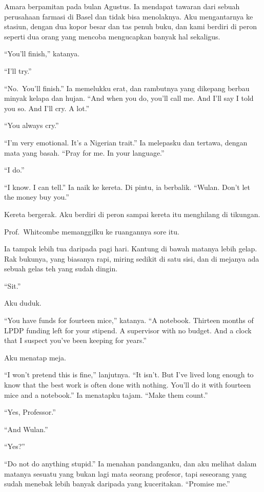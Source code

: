 \documentclass[11pt,twoside,openany]{book}
\begin{document}
Amara berpamitan pada bulan Agustus. Ia mendapat tawaran dari sebuah perusahaan farmasi di Basel dan tidak bisa menolaknya. Aku mengantarnya ke stasiun, dengan dua kopor besar dan tas penuh buku, dan kami berdiri di peron seperti dua orang yang mencoba mengucapkan banyak hal sekaligus.

``You'll finish,'' katanya.

``I'll try.''

``No.~You'll finish.'' Ia memelukku erat, dan rambutnya yang dikepang berbau minyak kelapa dan hujan. ``And when you do, you'll call me. And I'll say I told you so. And I'll cry. A lot.''

``You always cry.''

``I'm very emotional. It's a Nigerian trait.'' Ia melepasku dan tertawa, dengan mata yang basah. ``Pray for me. In your language.''

``I do.''

``I know. I can tell.'' Ia naik ke kereta. Di pintu, ia berbalik. ``Wulan. Don't let the money buy you.''

Kereta bergerak. Aku berdiri di peron sampai kereta itu menghilang di tikungan.

Prof.~Whitcombe memanggilku ke ruangannya sore itu.

Ia tampak lebih tua daripada pagi hari. Kantung di bawah matanya lebih gelap. Rak bukunya, yang biasanya rapi, miring sedikit di satu sisi, dan di mejanya ada sebuah gelas teh yang sudah dingin.

``Sit.''

Aku duduk.

``You have funds for fourteen mice,'' katanya. ``A notebook. Thirteen months of LPDP funding left for your stipend. A supervisor with no budget. And a clock that I suspect you've been keeping for years.''

Aku menatap meja.

``I won't pretend this is fine,'' lanjutnya. ``It isn't. But I've lived long enough to know that the best work is often done with nothing. You'll do it with fourteen mice and a notebook.'' Ia menatapku tajam. ``Make them count.''

``Yes, Professor.''

``And Wulan.''

``Yes?''

``Do not do anything stupid.'' Ia menahan pandanganku, dan aku melihat dalam matanya sesuatu yang bukan lagi mata seorang profesor, tapi seseorang yang sudah menebak lebih banyak daripada yang kuceritakan. ``Promise me.''
\end{document}
